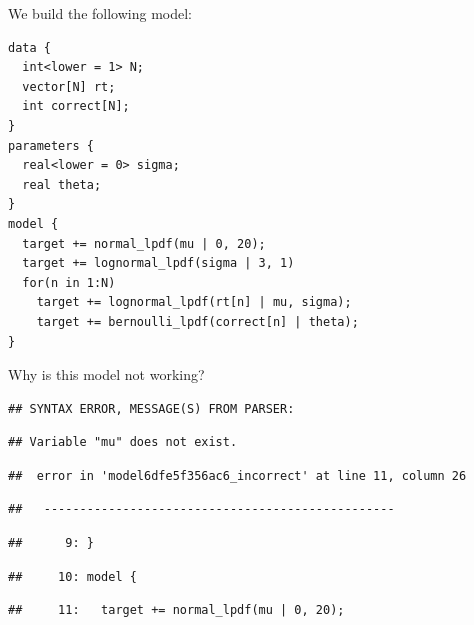 \documentclass[12pt,]{krantz}
\newenvironment{Shaded}{\begin{snugshade}}{\end{snugshade}}
\newcommand{\DataTypeTok}[1]{\textcolor[rgb]{0.13,0.29,0.53}{#1}}
\newcommand{\KeywordTok}[1]{\textcolor[rgb]{0.13,0.29,0.53}{\textbf{#1}}}
\newcommand{\NormalTok}[1]{#1}
\newcommand{\OperatorTok}[1]{\textcolor[rgb]{0.81,0.36,0.00}{\textbf{#1}}}
\newcommand{\StringTok}[1]{\textcolor[rgb]{0.31,0.60,0.02}{#1}}
\theoremstyle{definition}
\theoremstyle{definition}
\theoremstyle{definition}
\theoremstyle{remark}
\begin{document}
We build the following model:

\begin{verbatim}
data {
  int<lower = 1> N;
  vector[N] rt;
  int correct[N];
}
parameters {
  real<lower = 0> sigma;
  real theta;
}
model {
  target += normal_lpdf(mu | 0, 20);
  target += lognormal_lpdf(sigma | 3, 1)
  for(n in 1:N)
    target += lognormal_lpdf(rt[n] | mu, sigma);
    target += bernoulli_lpdf(correct[n] | theta);
}
\end{verbatim}

Why is this model not working?

\begin{Shaded}
\end{Shaded}

\begin{verbatim}
## SYNTAX ERROR, MESSAGE(S) FROM PARSER:
\end{verbatim}

\begin{verbatim}
## Variable "mu" does not exist.
\end{verbatim}

\begin{verbatim}
##  error in 'model6dfe5f356ac6_incorrect' at line 11, column 26
\end{verbatim}

\begin{verbatim}
##   -------------------------------------------------
\end{verbatim}

\begin{verbatim}
##      9: }
\end{verbatim}

\begin{verbatim}
##     10: model {
\end{verbatim}

\begin{verbatim}
##     11:   target += normal_lpdf(mu | 0, 20);
\end{verbatim}
\end{document}
